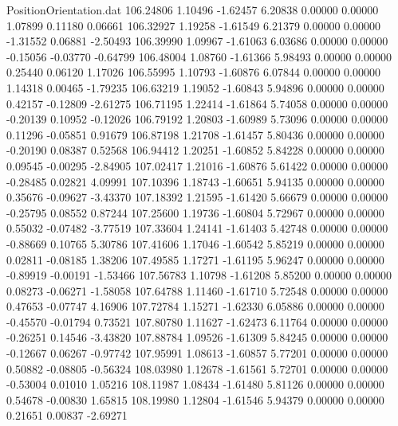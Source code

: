 \begin{filecontents}{PositionOrientation.dat}
 106.24806    1.10496   -1.62457     6.20838    0.00000    0.00000    1.07899    0.11180    0.06661
 106.32927    1.19258   -1.61549     6.21379    0.00000    0.00000   -1.31552    0.06881   -2.50493
 106.39990    1.09967   -1.61063     6.03686    0.00000    0.00000   -0.15056   -0.03770   -0.64799
 106.48004    1.08760   -1.61366     5.98493    0.00000    0.00000    0.25440    0.06120    1.17026
 106.55995    1.10793   -1.60876     6.07844    0.00000    0.00000    1.14318    0.00465   -1.79235
 106.63219    1.19052   -1.60843     5.94896    0.00000    0.00000    0.42157   -0.12809   -2.61275
 106.71195    1.22414   -1.61864     5.74058    0.00000    0.00000   -0.20139    0.10952   -0.12026
 106.79192    1.20803   -1.60989     5.73096    0.00000    0.00000    0.11296   -0.05851    0.91679
 106.87198    1.21708   -1.61457     5.80436    0.00000    0.00000   -0.20190    0.08387    0.52568
 106.94412    1.20251   -1.60852     5.84228    0.00000    0.00000    0.09545   -0.00295   -2.84905
 107.02417    1.21016   -1.60876     5.61422    0.00000    0.00000   -0.28485    0.02821    4.09991
 107.10396    1.18743   -1.60651     5.94135    0.00000    0.00000    0.35676   -0.09627   -3.43370
 107.18392    1.21595   -1.61420     5.66679    0.00000    0.00000   -0.25795    0.08552    0.87244
 107.25600    1.19736   -1.60804     5.72967    0.00000    0.00000    0.55032   -0.07482   -3.77519
 107.33604    1.24141   -1.61403     5.42748    0.00000    0.00000   -0.88669    0.10765    5.30786
 107.41606    1.17046   -1.60542     5.85219    0.00000    0.00000    0.02811   -0.08185    1.38206
 107.49585    1.17271   -1.61195     5.96247    0.00000    0.00000   -0.89919   -0.00191   -1.53466
 107.56783    1.10798   -1.61208     5.85200    0.00000    0.00000    0.08273   -0.06271   -1.58058
 107.64788    1.11460   -1.61710     5.72548    0.00000    0.00000    0.47653   -0.07747    4.16906
 107.72784    1.15271   -1.62330     6.05886    0.00000    0.00000   -0.45570   -0.01794    0.73521
 107.80780    1.11627   -1.62473     6.11764    0.00000    0.00000   -0.26251    0.14546   -3.43820
 107.88784    1.09526   -1.61309     5.84245    0.00000    0.00000   -0.12667    0.06267   -0.97742
 107.95991    1.08613   -1.60857     5.77201    0.00000    0.00000    0.50882   -0.08805   -0.56324
 108.03980    1.12678   -1.61561     5.72701    0.00000    0.00000   -0.53004    0.01010    1.05216
 108.11987    1.08434   -1.61480     5.81126    0.00000    0.00000    0.54678   -0.00830    1.65815
 108.19980    1.12804   -1.61546     5.94379    0.00000    0.00000    0.21651    0.00837   -2.69271

\end{filecontents}
